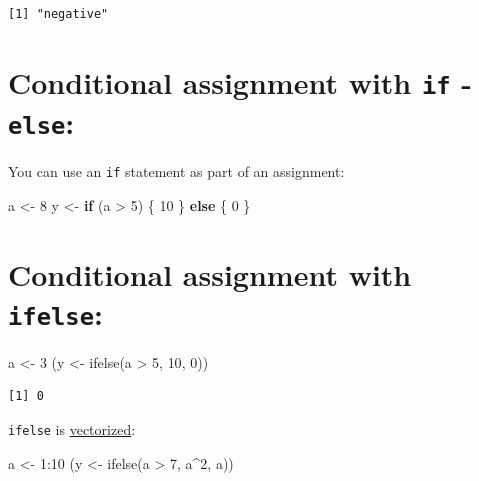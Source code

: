 \documentclass[
]{book}
\newenvironment{Shaded}{\begin{snugshade}}{\end{snugshade}}
\newcommand{\ControlFlowTok}[1]{\textcolor[rgb]{0.13,0.29,0.53}{\textbf{#1}}}
\newcommand{\DecValTok}[1]{\textcolor[rgb]{0.00,0.00,0.81}{#1}}
\newcommand{\FunctionTok}[1]{\textcolor[rgb]{0.00,0.00,0.00}{#1}}
\newcommand{\NormalTok}[1]{#1}
\newcommand{\OtherTok}[1]{\textcolor[rgb]{0.56,0.35,0.01}{#1}}
\newcommand{\SpecialCharTok}[1]{\textcolor[rgb]{0.00,0.00,0.00}{#1}}
\begin{document}
\begin{verbatim}
[1] "negative"
\end{verbatim}

\hypertarget{conditional-assignment-with-if---else}{%
\section{\texorpdfstring{Conditional assignment with \texttt{if} - \texttt{else}:}{Conditional assignment with if - else:}}\label{conditional-assignment-with-if---else}}

You can use an \texttt{if} statement as part of an assignment:

\begin{Shaded}
\begin{Highlighting}[]
\NormalTok{a }\OtherTok{\textless{}{-}} \DecValTok{8}
\NormalTok{y }\OtherTok{\textless{}{-}} \ControlFlowTok{if}\NormalTok{ (a }\SpecialCharTok{\textgreater{}} \DecValTok{5}\NormalTok{) \{}
  \DecValTok{10}
\NormalTok{\} }\ControlFlowTok{else}\NormalTok{ \{}
  \DecValTok{0}
\NormalTok{\}}
\end{Highlighting}
\end{Shaded}

\hypertarget{conditional-assignment-with-ifelse}{%
\section{\texorpdfstring{Conditional assignment with \texttt{ifelse}:}{Conditional assignment with ifelse:}}\label{conditional-assignment-with-ifelse}}

\begin{Shaded}
\begin{Highlighting}[]
\NormalTok{a }\OtherTok{\textless{}{-}} \DecValTok{3}
\NormalTok{(y }\OtherTok{\textless{}{-}} \FunctionTok{ifelse}\NormalTok{(a }\SpecialCharTok{\textgreater{}} \DecValTok{5}\NormalTok{, }\DecValTok{10}\NormalTok{, }\DecValTok{0}\NormalTok{))}
\end{Highlighting}
\end{Shaded}

\begin{verbatim}
[1] 0
\end{verbatim}

\texttt{ifelse} is \protect\hyperlink{vectorization}{vectorized}:

\begin{Shaded}
\begin{Highlighting}[]
\NormalTok{a }\OtherTok{\textless{}{-}} \DecValTok{1}\SpecialCharTok{:}\DecValTok{10}
\NormalTok{(y }\OtherTok{\textless{}{-}} \FunctionTok{ifelse}\NormalTok{(a }\SpecialCharTok{\textgreater{}} \DecValTok{7}\NormalTok{, a}\SpecialCharTok{\^{}}\DecValTok{2}\NormalTok{, a))}
\end{Highlighting}
\end{Shaded}
\end{document}
